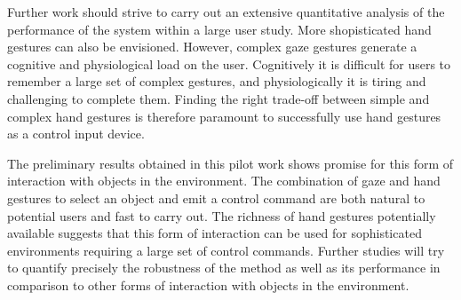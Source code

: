 \documentclass[jou,a4paper,notxfonts]{apa}
\begin{document}
Further work should strive to carry out an extensive quantitative analysis of the performance of the system within a
large user study. More shopisticated hand gestures can also be envisioned. However, complex gaze gestures generate a
cognitive and physiological load on the user. Cognitively it is difficult for users to remember a large set of complex
gestures, and physiologically it is tiring and challenging to complete them. Finding the right trade-off between simple
and complex hand gestures is therefore paramount to successfully use hand gestures as a control input device.


The preliminary results obtained  in this pilot work shows promise for this form of interaction with objects in the
environment. The combination of gaze and hand gestures to select an object  and emit a control command are both natural 
to potential users and fast to carry out. The richness of hand gestures potentially available suggests that this form of
interaction can be used for sophisticated environments requiring  a large set of control commands.
Further studies will try to quantify precisely the robustness of the method as well as its performance in comparison to
other forms of interaction  with objects in the environment.



\end{document}
